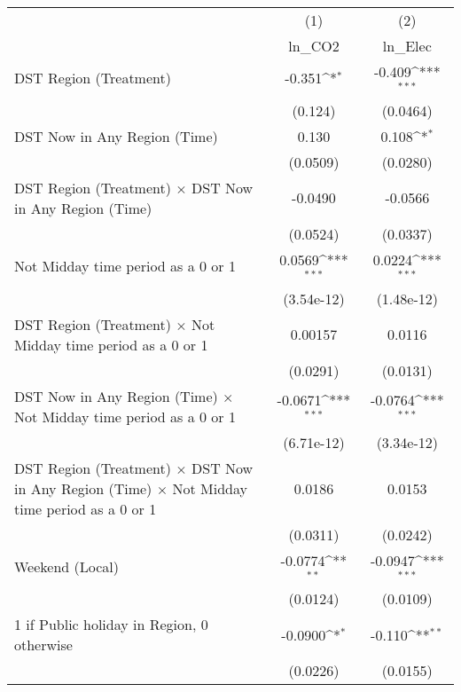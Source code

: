 {
\def\sym#1{\ifmmode^{#1}\else\(^{#1}\)\fi}
\begin{tabular}{l*{2}{c}}
\hline\hline
                    &\multicolumn{1}{c}{(1)}&\multicolumn{1}{c}{(2)}\\
                    &\multicolumn{1}{c}{ln\_CO2}&\multicolumn{1}{c}{ln\_Elec}\\
\hline
DST Region (Treatment)&      -0.351\sym{*}  &      -0.409\sym{***}\\
                    &     (0.124)         &    (0.0464)         \\
[1em]
DST Now in Any Region (Time)&       0.130         &       0.108\sym{*}  \\
                    &    (0.0509)         &    (0.0280)         \\
[1em]
DST Region (Treatment) $\times$ DST Now in Any Region (Time)&     -0.0490         &     -0.0566         \\
                    &    (0.0524)         &    (0.0337)         \\
[1em]
Not Midday time period as a 0 or 1&      0.0569\sym{***}&      0.0224\sym{***}\\
                    &  (3.54e-12)         &  (1.48e-12)         \\
[1em]
DST Region (Treatment) $\times$ Not Midday time period as a 0 or 1&     0.00157         &      0.0116         \\
                    &    (0.0291)         &    (0.0131)         \\
[1em]
DST Now in Any Region (Time) $\times$ Not Midday time period as a 0 or 1&     -0.0671\sym{***}&     -0.0764\sym{***}\\
                    &  (6.71e-12)         &  (3.34e-12)         \\
[1em]
DST Region (Treatment) $\times$ DST Now in Any Region (Time) $\times$ Not Midday time period as a 0 or 1&      0.0186         &      0.0153         \\
                    &    (0.0311)         &    (0.0242)         \\
[1em]
Weekend (Local)     &     -0.0774\sym{**} &     -0.0947\sym{***}\\
                    &    (0.0124)         &    (0.0109)         \\
[1em]
1 if Public holiday in Region, 0 otherwise&     -0.0900\sym{*}  &      -0.110\sym{**} \\
                    &    (0.0226)         &    (0.0155)         \\

\end{tabular}}
